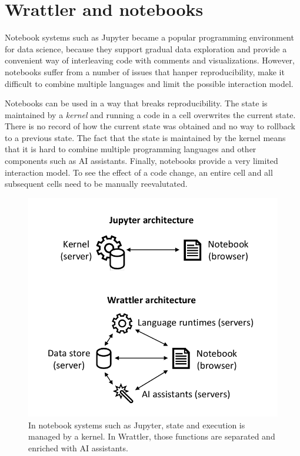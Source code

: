 \documentclass[sigplan,preprint,10pt]{acmart}\settopmatter{printfolios=true,printccs=false,printacmref=false}
\theoremstyle{plain}
\theoremstyle{definition}
\begin{document}
\section{Wrattler and notebooks}

Notebook systems such as Jupyter became a popular programming environment for data science, because 
they support gradual data exploration and provide a convenient way of interleaving code with 
comments and visualizations. However, notebooks suffer from a number of issues that hanper 
reproducibility, make it difficult to combine multiple languages and limit the possible interaction
model.

Notebooks can be used in a way that breaks reproducibility. The state is maintained by a \emph{kernel} 
and running a code in a cell overwrites the current state. There is no record of how the current 
state was obtained and no way to rollback to a previous state. The fact that the state is 
maintained by the kernel means that it is hard to combine multiple programming languages and
other components such as AI assistants. Finally, notebooks provide a very limited interaction 
model. To see the effect of a code change, an entire cell and all subsequent cells need to be
manually reevalutated.

\begin{figure}
\includegraphics[scale=0.6]{diagram.pdf}
\caption{In notebook systems such as Jupyter, state and execution is managed by a kernel. In
  Wrattler, those functions are separated and enriched with AI assistants.}
\label{fig:arch}
\end{figure}
\end{document}
